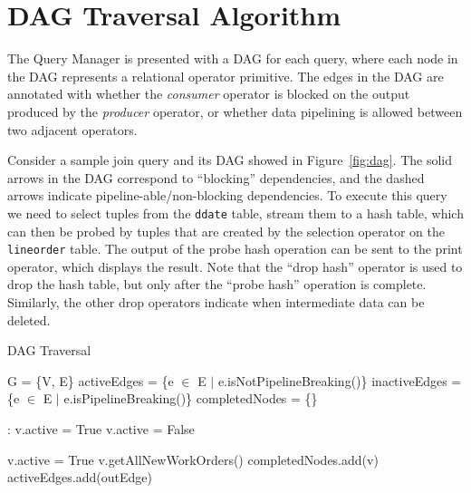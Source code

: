 
\section{DAG Traversal Algorithm}\label{apx:DAG-algo}
The Query Manager is presented with a DAG for each query, where each
node in the DAG represents a relational operator primitive.
The edges in the DAG are annotated with whether the 
\textit{consumer} operator is blocked on the output produced 
by the \textit{producer} operator, or whether data pipelining is
allowed between two adjacent operators. 

Consider a sample join query and its DAG showed in Figure~\ref{fig:dag}.
The solid arrows in the DAG correspond to ``blocking'' dependencies,
and the dashed arrows indicate pipeline-able/non-blocking dependencies. 
To execute this query we need to select tuples from the \verb+ddate+ 
table, stream them to a hash table, which can then be probed by tuples that are 
created by the selection operator on the \verb+lineorder+ table. %
The output of the probe hash operation can be sent to the print operator, which
displays the result. %
Note that the ``drop hash'' operator is used to drop the hash table, but only 
after the ``probe hash'' operation is complete. 
Similarly, the other drop operators indicate when intermediate data can be deleted. 

\begin{algorithm}
	\caption{DAG Traversal}
	\begin{algorithmic}[1]
		\State G = \{V, E\}
		\State activeEdges = \{e $\in$ E $|$ e.isNotPipelineBreaking()\}
		\label{alg:pipelining}
		\State inactiveEdges = \{e $\in$ E $|$ e.isPipelineBreaking()\}
		\State completedNodes = \{\}
		
		:
				\State v.active = True
			\Else
				\State v.active = False
			\EndIf
		\EndFor
		
			\State v.active = True \label{alg:depMet}
		\EndIf
		\State v.getAllNewWorkOrders() \label{alg:getWork}
		 \label{alg:finishGenWork}
		\State completedNodes.add(v) \label{alg:nodeComplete}
		\State activeEdges.add(outEdge)\label{alg:outEdgesActive}
		\EndFor
		\EndIf
		\EndIf
		\EndFor	
		\EndWhile
	\end{algorithmic}
	\label{alg:dag-traversal}
\end{algorithm}

